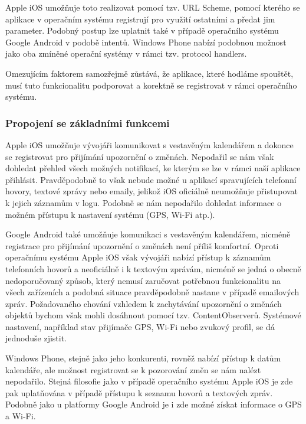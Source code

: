 \documentclass[thesis=M,czech]{FITthesis}[2012/06/26]
\begin{document}
Apple iOS umožňuje toto realizovat pomocí tzv. URL Scheme\cite{apple_url_scheme}, pomocí kterého se aplikace v operačním systému registrují pro využití ostatními\cite{apple_app_launch} a předat jim parameter\cite{apple_app_launch2}. Podobný postup lze uplatnit také v případě operačního systému Google Android v podobě intentů\cite{android_app_launch}. Windows Phone nabízí podobnou možnost jako oba zmíněné operační systémy v rámci tzv. protocol handlers\cite{win_app_launch}.

Omezujícím faktorem samozřejmě zůstává, že aplikace, které hodláme spouštět, musí tuto funkcionalitu podporovat a korektně se registrovat v rámci operačního systému.

\subsubsection*{Propojení se základními funkcemi}
Apple iOS umožňuje vývojáři komunikovat s vestavěným kalendářem a dokonce se registrovat pro přijímání upozornění o změnách\cite{apple_listener}. Nepodařil se nám však dohledat přehled všech možných notifikací, ke kterým se lze v rámci naší aplikace přihlásit. Pravděpodobně to však nebude možné u aplikací spravujících telefonní hovory, textové zprávy nebo emaily, jelikož iOS oficiálně neumožňuje přistupovat k jejich záznamům v logu\cite{apple_history}. Podobně se nám nepodařilo dohledat informace o možném přístupu k nastavení systému (GPS, Wi-Fi atp.).

Google Android také umožňuje komunikaci s vestavěným kalendářem\cite{android_calendar}\cite{android_calendar2}, nicméně registrace pro přijímání upozornění o změnách není příliš komfortní\cite{android_calendar3}\cite{android_calendar4}. Oproti operačnímu systému Apple iOS však vývojáři nabízí přístup k záznamům telefonních hovorů\cite{android_calllog} a neoficiálně i k textovým zprávám, nicméně se jedná o obecně nedoporučovaný způsob, který nemusí zaručovat potřebnou funkcionalitu na všech zařízeních\cite{android_sms} a podobná situace pravděpodobně nastane v případě emailových zpráv. Požadovaného chování vzhledem k zachytávání upozornění o změnách objektů bychom však mohli dosáhnout pomocí tzv. ContentObserverů\cite{android_observer}. Systémové nastavení, například stav přijímače GPS\cite{android_gps}, Wi-Fi\cite{android_wifi} nebo zvukový profil\cite{android_profile}, se dá jednoduše zjistit.

Windows Phone, stejně jako jeho konkurenti, rovněž nabízí přístup k datům kalendáře\cite{win_calendar}, ale možnost registrovat se k pozorování změn se nám nalézt nepodařilo. Stejná filosofie jako v případě operačního systému Apple iOS je zde pak uplatňována v případě přístupu k seznamu hovorů a textových zpráv\cite{win_incoming_event}. Podobně jako u platformy Google Android je i zde možné získat informace o GPS\cite{win_location} a Wi-Fi\cite{win_wifi}.
\end{document}
